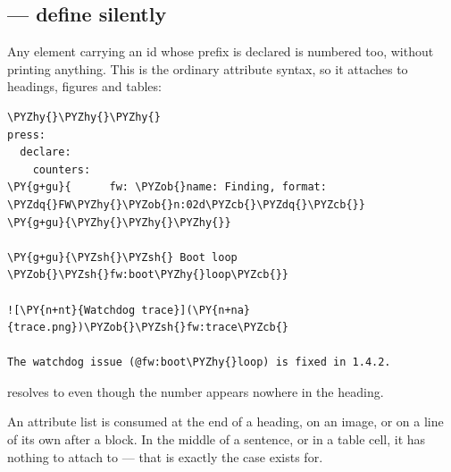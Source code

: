 \documentclass[a4paper,twoside]{article}
\begin{document}
\subsection{ --- define silently}
Any element carrying an id whose prefix is declared is numbered too, without
printing anything. This is the ordinary attribute syntax, so it
attaches to headings, figures and tables:
\begin{tscode}[lang=md, engine=pygments]
\begin{Verbatim}[commandchars=\\\{\},breaklines, breakanywhere, commandchars=\\\{\}]
\PYZhy{}\PYZhy{}\PYZhy{}
press:
  declare:
    counters:
\PY{g+gu}{      fw: \PYZob{}name: Finding, format: \PYZdq{}FW\PYZhy{}\PYZob{}n:02d\PYZcb{}\PYZdq{}\PYZcb{}}
\PY{g+gu}{\PYZhy{}\PYZhy{}\PYZhy{}}

\PY{g+gu}{\PYZsh{}\PYZsh{} Boot loop \PYZob{}\PYZsh{}fw:boot\PYZhy{}loop\PYZcb{}}

![\PY{n+nt}{Watchdog trace}](\PY{n+na}{trace.png})\PYZob{}\PYZsh{}fw:trace\PYZcb{}

The watchdog issue (@fw:boot\PYZhy{}loop) is fixed in 1.4.2.
\end{Verbatim}
\end{tscode}
 resolves to  even though the number appears nowhere in
the heading.
\begin{tscallout}[kind=warning, title={An attribute needs a host}]
An attribute list is consumed at the end of a heading, on an image, or on a
line of its own after a block. In the middle of a sentence, or in a table
cell, it has nothing to attach to --- that is exactly the case
 exists for.
\end{tscallout}
\end{document}
